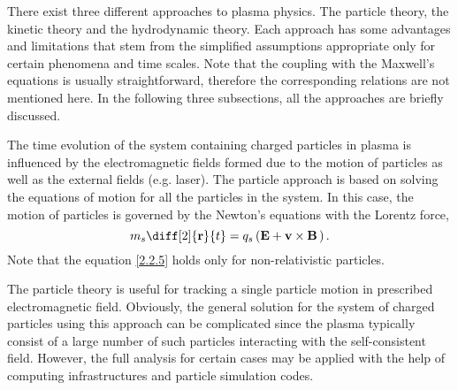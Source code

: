 There exist three different approaches to plasma physics. The particle theory, the kinetic theory and the hydrodynamic theory. Each approach has some advantages and limitations that stem from the simplified assumptions appropriate only for certain phenomena and time scales. Note that the coupling with the Maxwell's equations is usually straightforward, therefore the corresponding relations are not mentioned here. In the following three subsections, all the approaches are briefly discussed. 

The time evolution of the system containing charged particles in plasma is influenced by the electromagnetic fields formed due to the motion of particles as well as the external fields (e.g. laser). The particle approach is based on solving the equations of motion for all the particles in the system. In this case, the motion of particles is governed by the Newton's equations with the Lorentz force,
\begin{equation}
\label{2.2.5}
m_s \diff[2]{\vec{r}}{t} = q_s \left(\vec{E} + \vec{v} \times \vec{B} \, \right).
\end{equation}
Note that the equation \ref{2.2.5} holds only for non-relativistic particles. 

The particle theory is useful for tracking a single particle motion in prescribed electromagnetic field. Obviously, the general solution for the system of charged particles using this approach can be complicated since the plasma typically consist of a large number of such particles interacting with the self-consistent field. However, the full analysis for certain cases may be applied with the help of computing infrastructures and particle simulation codes.

